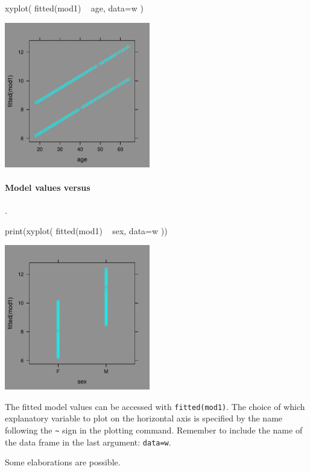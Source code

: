\begin{Schunk}
\begin{Sinput}
 xyplot( fitted(mod1) ~ age, data=w )
\end{Sinput}
\end{Schunk}
  
\centerline{\includegraphics[width=2.5in]{Figures/fig-gmf1}}

\paragraph{Model values versus }.

\begin{Schunk}
\begin{Sinput}
 print(xyplot( fitted(mod1) ~ sex, data=w ))
\end{Sinput}
\end{Schunk}
\centerline{\includegraphics[width=2.5in]{Figures/fig-gmf2}}


The fitted model values can be accessed with \texttt{fitted(mod1)}.
The choice of which explanatory variable to plot on the horizontal
axis is specified by the name following the \verb.~. sign in the
plotting command.  Remember to include the name of the data frame in
the last argument: \texttt{data=w}.


Some elaborations are possible.

